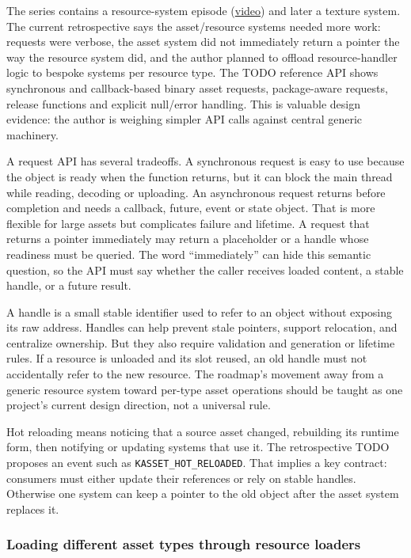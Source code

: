 The series contains a resource-system episode (\href{https://www.youtube.com/watch?v=ubin1HH_kqw}{video}) and later a texture system. The current retrospective says the asset/resource systems needed more work: requests were verbose, the asset system did not immediately return a pointer the way the resource system did, and the author planned to offload resource-handler logic to bespoke systems per resource type. The TODO reference API shows synchronous and callback-based binary asset requests, package-aware requests, release functions and explicit null/error handling. This is valuable design evidence: the author is weighing simpler API calls against central generic machinery.

A request API has several tradeoffs. A synchronous request is easy to use because the object is ready when the function returns, but it can block the main thread while reading, decoding or uploading. An asynchronous request returns before completion and needs a callback, future, event or state object. That is more flexible for large assets but complicates failure and lifetime. A request that returns a pointer immediately may return a placeholder or a handle whose readiness must be queried. The word ``immediately'' can hide this semantic question, so the API must say whether the caller receives loaded content, a stable handle, or a future result.

A handle is a small stable identifier used to refer to an object without exposing its raw address. Handles can help prevent stale pointers, support relocation, and centralize ownership. But they also require validation and generation or lifetime rules. If a resource is unloaded and its slot reused, an old handle must not accidentally refer to the new resource. The roadmap's movement away from a generic resource system toward per-type asset operations should be taught as one project's current design direction, not a universal rule.

Hot reloading means noticing that a source asset changed, rebuilding its runtime form, then notifying or updating systems that use it. The retrospective TODO proposes an event such as \texttt{KASSET\_HOT\_RELOADED}. That implies a key contract: consumers must either update their references or rely on stable handles. Otherwise one system can keep a pointer to the old object after the asset system replaces it.

\subsubsection{Loading different asset types through resource loaders}\label{06-engine-ii-ch027-loading-different-asset-types-through-resource-loaders}

